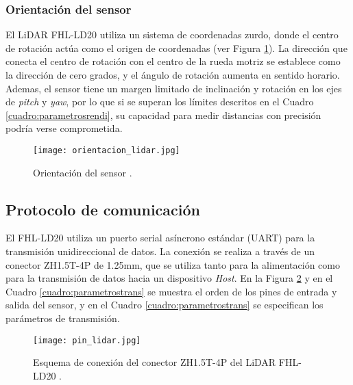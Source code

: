 \subsubsection{Orientación del sensor}
El LiDAR FHL-LD20 utiliza un sistema de coordenadas zurdo, donde el centro de rotación actúa como el origen de coordenadas (ver Figura \ref{fig:orientación}). La dirección que conecta el centro de rotación con el centro de la rueda motriz se establece como la dirección de cero grados, y el ángulo de rotación aumenta en sentido horario. Ademas, el sensor tiene un margen limitado de inclinación y rotación en los ejes de \textit{pitch} y \textit{yaw}, por lo que si se superan los límites descritos en el Cuadro \ref{cuadro:parametrosrendi}, su capacidad para medir distancias con precisión podría verse comprometida.

\begin{figure}[H]
	\centering
	\texttt{[image: orientacion\_lidar.jpg]}
	\caption{Orientación del sensor \cite{youyeetoo_tech_ld20_nodate}.}
	\label{fig:orientación}
\end{figure}

\subsection{Protocolo de comunicación}
El FHL-LD20 utiliza un puerto serial asíncrono estándar (UART) para la transmisión unidireccional de datos. La conexión se realiza a través de un conector ZH1.5T-4P de 1.25mm, que se utiliza tanto para la alimentación como para la transmisión de datos hacia un dispositivo \textit{Host}. En la Figura \ref{fig:pines} y en el Cuadro \ref{cuadro:parametrostrans} se muestra el orden de los pines de entrada y salida del sensor, y en el Cuadro \ref{cuadro:parametrostrans} se especifican los parámetros de transmisión.

\begin{figure}[H]
	\centering
	\texttt{[image: pin\_lidar.jpg]}
	\caption{Esquema de conexión del conector ZH1.5T-4P del LiDAR FHL-LD20 \cite{youyeetoo_tech_ld20_nodate}.}
	\label{fig:pines}
\end{figure}


